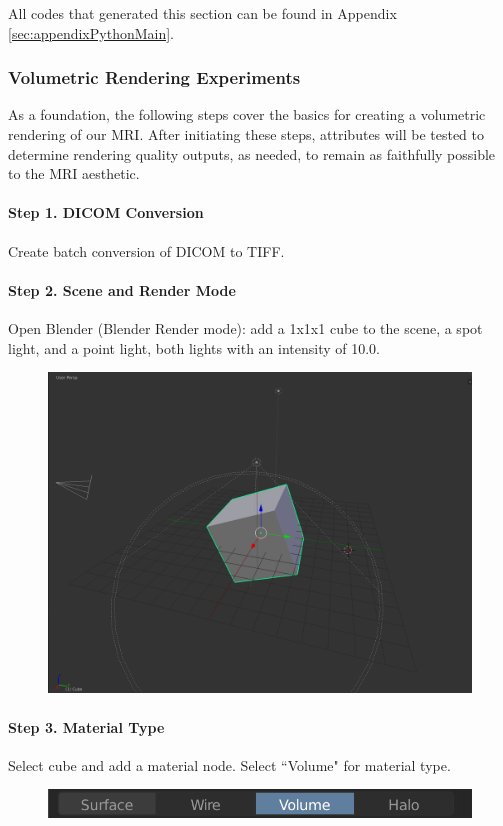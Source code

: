 All codes that generated this section can be found in Appendix \ref{sec:appendixPythonMain}.

\subsubsection{Volumetric Rendering Experiments}
As a foundation, the following steps cover the basics for creating a volumetric rendering of our MRI. After initiating these steps, attributes will be tested to determine rendering quality outputs, as needed, to remain as faithfully possible to the MRI aesthetic.\\

\paragraph{Step 1. DICOM Conversion}
Create batch conversion of DICOM to TIFF.\\

\paragraph{Step 2. Scene and Render Mode}
Open Blender (Blender Render mode): add a 1x1x1 cube to the scene, a spot light, and a point light, both lights with an intensity of 10.0.

\begin{figure}[H]
  \centering
  \includegraphics[width=0.5\linewidth]{img/cube.png}
  \label{fig:resultsCubeVolume}
\end{figure}

\paragraph{Step 3. Material Type}
Select cube and add a material node. Select ``Volume" for material type.
\begin{figure}[H]
  \centering
  \includegraphics[width=0.5\linewidth]{img/volume.png}
  \label{fig:resultsCubeVolumeType}
\end{figure}


